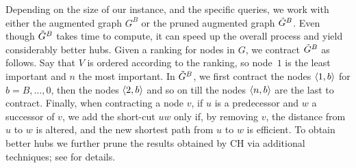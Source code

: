 Depending on the size of our instance, and the specific queries, we work with either the augmented graph $G^B$ or the pruned augmented graph $\tilde G^B$.
Even though $\tilde G^B$ takes time to compute, it can speed up the overall process and yield considerably better hubs. 
Given a ranking for nodes in $G$, we contract $\tilde G^B$ as follows.
Say that $V$ is ordered according to the ranking, so node~$1$ is the least important and $n$ the most important.
In $\tilde G^B$, we first contract the nodes $\langle1,b\rangle$ for $b=B,\ldots,0$, then the nodes $\langle2,b\rangle$ and so on till the nodes $\langle n,b\rangle$ are the last to contract. 
Finally, when contracting a node $v$, if $u$ is a predecessor and $w$ a successor of $v$, we add the short-cut $uw$ only if, by removing $v$, the distance from $u$ to $w$ is altered, and the new shortest path from $u$ to $w$ is efficient.
To obtain better hubs we further prune the results obtained by CH via additional techniques; see \cite{TechReport} for details.

